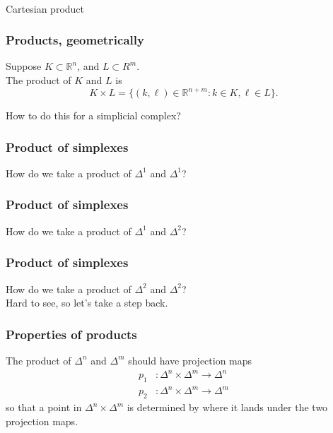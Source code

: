 \documentclass[14pt]{beamer}
\newcommand{\R}{\mathbb{R}}
\begin{document}
\begin{frame}
  \vfill
  \begin{center}
    \scalebox{5}{\Huge $\times$} \\
   \vspace{2ex}Cartesian product
  \end{center}
  \vfill
\end{frame}


\begin{frame}
  \frametitle{Products, geometrically}

\begin{definition}
Suppose $K \subset \R^n$, and $L \subset R^m$. \\
The product of $K$ and $L$ is
$$
K \times L = \{ (k,\ell) \in \R^{n+m} : k \in K, \ell \in L \}.
$$
\end{definition}

\pause
\vfill
How to do this for a simplicial complex?

\end{frame}

\begin{frame}
 \frametitle{Product of simplexes}
 How do we take a product of $\Delta^1$ and $\Delta^1$?
 \vfill
\end{frame}

\begin{frame}
\frametitle{Product of simplexes}
How do we take a product of $\Delta^1$ and $\Delta^2$?
\vfill
\end{frame}

\begin{frame}
\frametitle{Product of simplexes}
How do we take a product of $\Delta^2$ and $\Delta^2$? \\\pause
Hard to see, so let's take a step back.
\vfill
\end{frame}

\begin{frame}
\frametitle{Properties of products}

The product of $\Delta^n$ and $\Delta^m$ should have projection maps
\begin{align*}
p_1 &: \Delta^n \times \Delta^m \to \Delta^n \\
p_2 &: \Delta^n \times \Delta^m \to \Delta^m
\end{align*}
so that a point in $\Delta^n \times \Delta^m$ is determined by where
it lands under the two projection maps.

\vfill

\end{frame}
\end{document}
